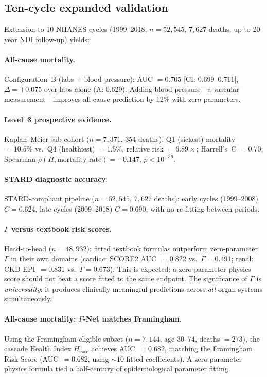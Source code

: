 \documentclass[aps,pre,twocolumn,superscriptaddress,floatfix]{revtex4-2}
\begin{document}
\subsection{Ten-cycle expanded validation}
\label{sec:nhanes-10cycle}

Extension to 10 NHANES cycles (1999--2018,
$n = 52{,}545$, $7{,}627$ deaths, up to 20-year
NDI follow-up) yields:

\paragraph{All-cause mortality.}
Configuration~B (labs + blood pressure):
AUC $= 0.705$ [CI: 0.699--0.711],
$\Delta = +0.075$ over labs alone (A: 0.629).
Adding blood pressure---a vascular measurement---improves
all-cause prediction by 12\% with zero parameters.

\paragraph{Level~3 prospective evidence.}
Kaplan--Meier sub-cohort ($n = 7{,}371$, 354 deaths):
Q1 (sickest) mortality $= 10.5\%$ vs.\ Q4 (healthiest)
$= 1.5\%$, relative risk $= 6.89\times$;
Harrell's~C $= 0.70$;
Spearman $\rho(H, \text{mortality rate}) = -0.147$,
$p < 10^{-36}$.

\paragraph{STARD diagnostic accuracy.}
STARD-compliant pipeline ($n = 52{,}545$, $7{,}627$
deaths): early cycles (1999--2008) $C = 0.624$,
late cycles (2009--2018) $C = 0.690$, with no
re-fitting between periods.

\paragraph{$\Gamma$ versus textbook risk scores.}
Head-to-head ($n = 48{,}932$): fitted textbook formulas
outperform zero-parameter $\Gamma$ in their own domains
(cardiac: SCORE2 AUC~$= 0.822$ vs.\ $\Gamma = 0.491$;
renal: CKD-EPI~$= 0.831$ vs.\ $\Gamma = 0.673$).
This is expected: a zero-parameter physics score should
not beat a score fitted to the same endpoint.
The significance of $\Gamma$ is \emph{universality}:
it produces clinically meaningful predictions across
\emph{all} organ systems simultaneously.

\paragraph{All-cause mortality: $\Gamma$-Net matches
  Framingham.}
Using the Framingham-eligible subset
($n = 7{,}144$, age 30--74, deaths $= 273$),
the cascade Health Index $H_{\text{casc}}$
achieves AUC~$= 0.682$,
matching the Framingham Risk Score
(AUC~$= 0.682$, using $\sim\!10$ fitted
coefficients).
A zero-parameter physics formula
tied a half-century of epidemiological
parameter fitting.
\end{document}
